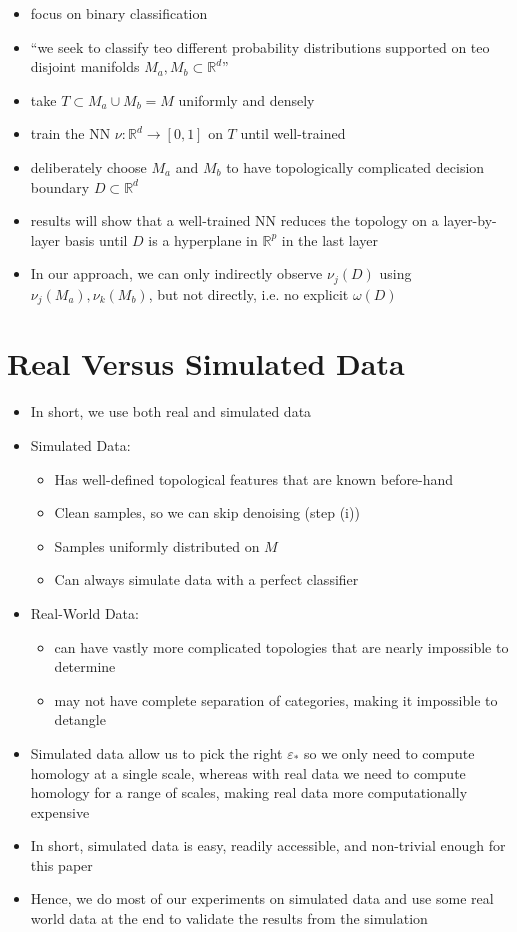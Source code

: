 \documentclass{article}
\newcommand{\R}{\mathbb{R}}
\begin{document}
\begin{itemize}
	\item focus on binary classification
	\item ``we seek to classify teo different probability distributions supported on teo disjoint manifolds $M_a, M_b \subset \R^d$''
	\item take $T \subset M_a \cup M_b = M$ uniformly and densely 
	\item train the NN $\nu : \R^d \to [0, 1]$ on $T$ until well-trained
	\item deliberately choose $M_a$ and $M_b$ to have topologically complicated decision boundary $D \subset \R^d$
	\item results will show that a well-trained NN reduces the topology on a layer-by-layer basis until $D$ is a hyperplane in $\R^p$ in the last layer
	\item In our approach, we can only indirectly observe $\nu_j(D)$ using $\nu_j(M_a), \nu_k(M_b)$, but not directly, i.e. no explicit $\omega(D)$
\end{itemize}


\section*{Real Versus Simulated Data}

\begin{itemize}
	\item In short, we use both real and simulated data
	\item Simulated Data:
		\begin{itemize}
			\item Has well-defined topological features that are known before-hand
			\item Clean samples, so we can skip denoising (step (i))
			\item Samples uniformly distributed on $M$
			\item Can always simulate data with a perfect classifier
		\end{itemize}
	\item Real-World Data:
		\begin{itemize}
			\item can have vastly more complicated topologies that are nearly impossible to determine
			\item may not have complete separation of categories, making it impossible to detangle
		\end{itemize}
	\item Simulated data allow us to pick the right $\varepsilon_*$ so we only need to compute homology at a single scale, whereas with real data we need to compute homology for a range of scales, making real data more computationally expensive
	\item In short, simulated data is easy, readily accessible, and non-trivial enough for this paper
	\item Hence, we do most of our experiments on simulated data and use some real world data at the end to validate the results from the simulation
\end{itemize}
\end{document}
